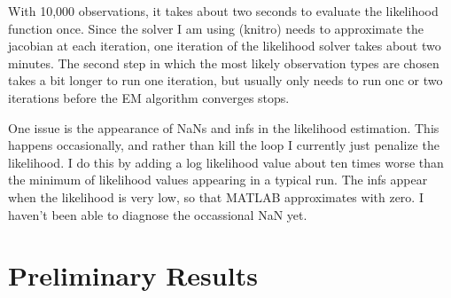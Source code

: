 \documentclass{article}
\begin{document}
With 10,000 observations, it takes about two seconds to evaluate the likelihood function once.
Since the solver I am using (knitro) needs to approximate the jacobian at each iteration, one iteration of the likelihood solver takes about two minutes.
The second step in which the most likely observation types are chosen takes a bit longer to run one iteration, but usually only needs to run onc or two iterations before the EM algorithm converges stops.

One issue is the appearance of NaNs and infs in the likelihood estimation. 
This happens occasionally, and rather than kill the loop I currently just penalize the likelihood.
I do this by adding a log likelihood value about ten times worse than the minimum of likelihood values appearing in a typical run.
The infs appear when the likelihood is very low, so that MATLAB approximates with zero.
I haven't been able to diagnose the occassional NaN yet.

\section{Preliminary Results}


\end{document}
